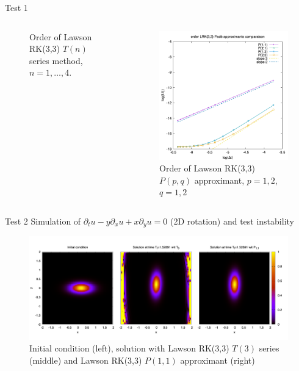 \documentclass{beamer}
\begin{document}
\begin{frame}{Test 1}
{\begin{columns}
\begin{column}{0.5\textwidth}
\begin{figure}
          \caption{Order of Lawson RK(3,3) $T(n)$ series method, $n=1,\dots,4$.}
        \end{figure}
      \end{column}
      \begin{column}{0.5\textwidth}
        \begin{figure}
          \centering
          \includegraphics[height=0.6\textheight]{img/order_lrk33pade}
          \caption{Order of Lawson RK(3,3) $P(p,q)$ approximant, $p=1,2$, $q=1,2$}
        \end{figure}
      \end{column}
    \end{columns}
  }
\end{frame}
\begin{frame}{Test 2}
  Simulation of $\partial_t u - y\partial_x u + x\partial_y u = 0$ (2D rotation) and test instability
  \begin{figure}
    \centering
    \includegraphics[width=\textwidth]{img/uf_t3p11}
    \caption{Initial condition (left), solution with Lawson RK(3,3) $T(3)$ series (middle) and Lawson RK(3,3) $P(1,1)$ approximant (right)}
  \end{figure}
\end{frame}
\end{document}

